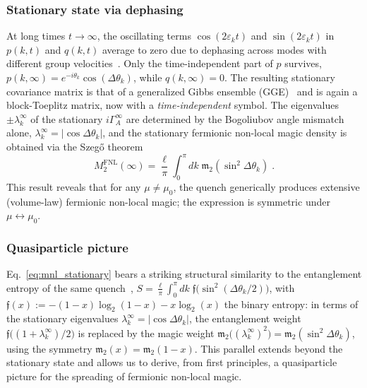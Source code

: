 \documentclass[prx,twocolumn,superscriptaddress,aps,10pt, frontmatterverbose, reprint,footinbib,longbibliography=true]{revtex4-2}
\begin{document}
\subsubsection{Stationary state via dephasing}
At long times $t\to\infty$, the oscillating terms $\cos (2\varepsilon_k t)$ and $\sin(2\varepsilon_k t)$ in $p(k,t)$ and $q(k,t)$ average to zero due to dephasing across modes with different group velocities~\cite{Calabrese2005evolution}.
Only the time-independent part of $p$ survives, $p(k,\infty) = e^{-i\theta_k}\cos(\Delta\theta_k)$, while $q(k,\infty) = 0$.
The resulting stationary covariance matrix is that of a generalized Gibbs ensemble (GGE)~\cite{Calabrese2005evolution,vidmar2017entanglement} and is again a block-Toeplitz matrix, now with a \emph{time-independent} symbol.
The eigenvalues $\pm\lambda_k^\infty$ of the stationary $i\Gamma_A^\infty$ are determined by the Bogoliubov angle mismatch alone, $\lambda_k^\infty=|\cos\Delta\theta_k|$, 
 and the stationary fermionic non-local magic density is obtained via the Szeg\H{o} theorem~\cite{Calabrese2005evolution}
\begin{equation}
    M_2^{\mathrm{FNL}}(\infty) = \frac{\ell}{\pi}\int_0^\pi\! dk\; \mathfrak{m}_2\!\left(\sin^2\!\Delta\theta_k\right)\;.
    \label{eq:mnl_stationary}
\end{equation}
This result reveals that for any $\mu\neq \mu_0$, the quench generically produces extensive (volume-law) fermionic non-local magic; the expression is symmetric under $\mu \leftrightarrow \mu_0$.

\subsubsection{Quasiparticle picture}
Eq.~\eqref{eq:mnl_stationary} bears a striking structural similarity to the entanglement entropy of the same quench~\cite{Calabrese2005evolution}, $S=\frac{\ell}{\pi} \int_0^\pi\! dk\; \mathfrak{f}\bigl(\sin^2(\Delta\theta_k/2)\bigr)$, with $\mathfrak{f}(x):= -(1-x)\log_2(1-x)-x\log_2(x)$  the binary entropy: in terms of the stationary eigenvalues $\lambda_k^{\infty}=|\cos\Delta\theta_k|$, the entanglement weight $\mathfrak{f}\bigl((1+\lambda_k^{\infty})/2\bigr)$ is replaced by the magic weight $\mathfrak{m}_2\bigl((\lambda_k^{\infty})^2\bigr)=\mathfrak{m}_2(\sin^2\!\Delta\theta_k)$, using the symmetry $\mathfrak{m}_2(x)=\mathfrak{m}_2(1-x)$.
This parallel extends beyond the stationary state and allows us to derive, from first principles, a quasiparticle picture for the spreading of fermionic non-local magic.
\end{document}
